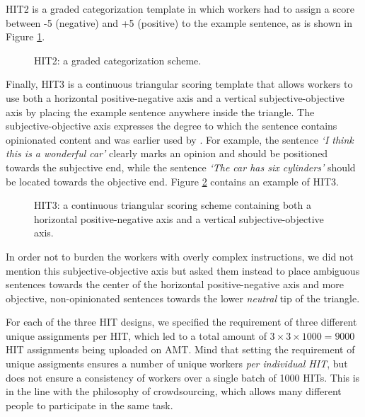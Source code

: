 \documentclass[11pt]{elsarticle}
\begin{document}
HIT2 is a graded categorization template in which workers had to assign a score between -5 (negative) and +5 (positive) to the example sentence, as is shown in Figure \ref{hit2}.

\begin{figure}[ht]
  \begin{center}
\caption{HIT2: a graded categorization scheme.}
\label{hit2}
  \end{center}
\end{figure}

Finally, HIT3 is a continuous triangular scoring template that allows workers to use both a horizontal positive-negative axis and a vertical subjective-objective axis by placing the example sentence anywhere inside the triangle. The subjective-objective axis expresses the degree to which the sentence contains opinionated content and was earlier used by \cite{sentiwordnet:10}. For example, the sentence \textit{`I think this is a wonderful car'} clearly marks an opinion and should be positioned towards the subjective end, while the sentence \textit{`The car has six cylinders'} should be located towards the objective end. Figure \ref{hit3} contains an example of HIT3.

\begin{figure}[ht]
  \begin{center}
\caption{HIT3: a continuous triangular scoring scheme containing both a horizontal positive-negative axis and a vertical subjective-objective axis.}
\label{hit3}
  \end{center}
\end{figure}

In order not to burden the workers with overly complex instructions, we did not mention this subjective-objective axis but asked them instead to place ambiguous sentences towards the center of the horizontal positive-negative axis and more objective, non-opinionated sentences towards the lower \textit{neutral} tip of the triangle.

For each of the three HIT designs, we specified the requirement of three different unique assignments per HIT, which led to a total amount of $3 \times 3 \times 1000 = 9000$ HIT assignments being uploaded on AMT. Mind that setting the requirement of unique assigments ensures a number of unique workers \textit{per individual HIT}, but does not ensure a consistency of workers over a single batch of 1000 HITs. This is in the line with the philosophy of crowdsourcing, which allows many different people to participate in the same task.
\end{document}
